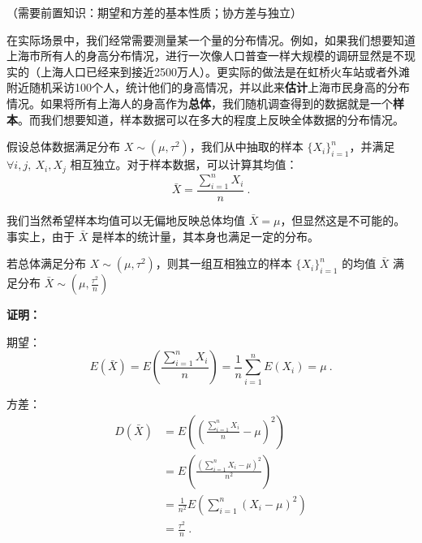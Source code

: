 
\begin{issues}
\issueDraft
\issueMissDepend
\end{issues}
（需要前置知识：期望和方差的基本性质；协方差与独立）

在实际场景中，我们经常需要测量某一个量的分布情况。例如，如果我们想要知道上海市所有人的身高分布情况，进行一次像人口普查一样大规模的调研显然是不现实的（上海人口已经来到接近2500万人）。更实际的做法是在虹桥火车站或者外滩附近随机采访100个人，统计他们的身高情况，并以此来\textbf{估计}上海市民身高的分布情况。如果将所有上海人的身高作为\textbf{总体}，我们随机调查得到的数据就是一个\textbf{样本}。而我们想要知道，样本数据可以在多大的程度上反映全体数据的分布情况。

假设总体数据满足分布 $X\sim(\mu, \tau^2)$，我们从中抽取的样本 $\{X_i \}_{i=1}^n$，并满足 $\forall i,j,\ X_i,X_j$ 相互独立。对于样本数据，可以计算其均值：\begin{equation}
\bar X=\frac{\sum_{i=1}^n X_i}{n}~.
\end{equation}

我们当然希望样本均值可以无偏地反映总体均值 $\bar X=\mu$，但显然这是不可能的。事实上，由于 $\bar X$ 是样本的统计量，其本身也满足一定的分布。

\begin{theorem}{}
若总体满足分布 $X\sim (\mu, \tau^2)$，则其一组互相独立的样本 $\{X_i \}_{i=1}^n$ 的均值 $\bar X$ 满足分布 $\bar X\sim (\mu, \frac{\tau^2}{n})$
\end{theorem}
\textbf{证明：}

期望：
\begin{equation}
E(\bar X) =E(\frac{\sum_{i=1}^n X_i}{n}) 
        =\frac 1 n \sum_{i=1}^n E(X_i)=\mu~.
\end{equation}

方差：
\begin{equation}
\begin{aligned}
D(\bar X) &=E((\frac{\sum_{i=1}^n X_i}{n}-\mu)^2)\\
&= E(\frac{(\sum_{i=1}^n X_i-\mu)^2}{n^2}) \\
&=\frac {1} {n^2} E(\sum_{i=1}^n (X_i-\mu)^2) \\
&=\frac {\tau^2}{n}~.
\end{aligned}
\end{equation}

